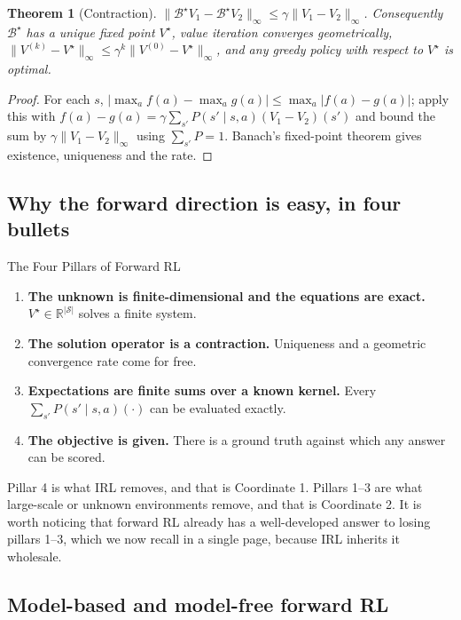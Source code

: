 \documentclass[11pt]{article}
\theoremstyle{plain}
\newtheorem{theorem}{Theorem}[section]
\theoremstyle{definition}
\theoremstyle{remark}
\renewcommand{\S}{\mathcal{S}}
\newcommand{\R}{\mathbb{R}}
\begin{document}
\begin{theorem}[Contraction]\label{thm:contraction}
$\|\mathcal{B}^\star V_1 - \mathcal{B}^\star V_2\|_\infty \le \gamma \|V_1 -
V_2\|_\infty$. Consequently $\mathcal{B}^\star$ has a unique fixed point
$V^\star$, value iteration converges geometrically,
$\|V^{(k)}-V^\star\|_\infty \le \gamma^k \|V^{(0)}-V^\star\|_\infty$, and
any greedy policy with respect to $V^\star$ is optimal.
\end{theorem}

\begin{proof}
For each $s$, $|\max_a f(a) - \max_a g(a)| \le \max_a |f(a)-g(a)|$; apply
this with $f(a)-g(a) = \gamma\sum_{s'}P(s'\mid s,a)(V_1-V_2)(s')$ and bound
the sum by $\gamma\|V_1-V_2\|_\infty$ using $\sum_{s'}P=1$. Banach's
fixed-point theorem gives existence, uniqueness and the rate.
\end{proof}

\subsection{Why the forward direction is easy, in four bullets}

\begin{graybox}{The Four Pillars of Forward RL}
\begin{enumerate}
\item \textbf{The unknown is finite-dimensional and the equations are
exact.} $V^\star \in \R^{|\S|}$ solves a finite system.
\item \textbf{The solution operator is a contraction.} Uniqueness and a
geometric convergence rate come for free.
\item \textbf{Expectations are finite sums over a known kernel.} Every
$\sum_{s'}P(s'\mid s,a)(\cdot)$ can be evaluated exactly.
\item \textbf{The objective is given.} There is a ground truth against
which any answer can be scored.
\end{enumerate}
\end{graybox}

Pillar 4 is what IRL removes, and that is Coordinate 1. Pillars 1--3 are
what large-scale or unknown environments remove, and that is Coordinate 2.
It is worth noticing that forward RL already has a well-developed answer to
losing pillars 1--3, which we now recall in a single page, because IRL
inherits it wholesale.

\subsection{Model-based and model-free forward RL}
\end{document}
